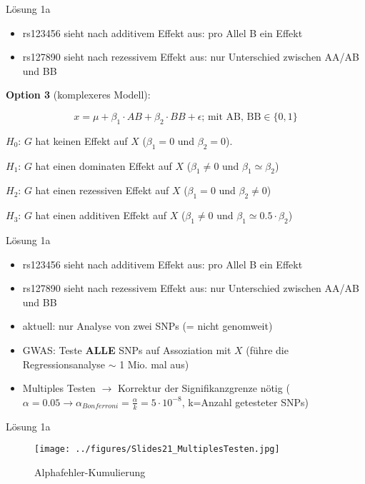 \documentclass{beamer}
\begin{document}
\begin{frame}{Lösung 1a}
\begin{itemize}
    \item rs123456 sieht nach additivem Effekt aus: pro Allel B ein Effekt
    \item rs127890 sieht nach rezessivem Effekt aus: nur Unterschied zwischen AA/AB und BB
\end{itemize}

\textbf{Option 3} (komplexeres Modell):

$$ x = \mu + \beta_1 \cdot AB + \beta_2 \cdot BB + \epsilon \text{;  mit AB, BB} \in \{0,1\}$$

$H_0$: $G$ hat keinen Effekt auf $X$ ($\beta_1 = 0$ und $\beta_2 = 0$). 

$H_1$: $G$ hat einen dominaten Effekt auf $X$ ($\beta_1 \neq 0$ und $\beta_1 \simeq \beta_2$)

$H_2$: $G$ hat einen rezessiven Effekt auf $X$ ($\beta_1 = 0$ und $\beta_2 \neq 0$)

$H_3$: $G$ hat einen additiven Effekt auf $X$ ($\beta_1 \neq 0$ und $\beta_1 \simeq 0.5 \cdot \beta_2$)

\end{frame}

\begin{frame}{Lösung 1a}
\begin{itemize}
    \item rs123456 sieht nach additivem Effekt aus: pro Allel B ein Effekt
    \item rs127890 sieht nach rezessivem Effekt aus: nur Unterschied zwischen AA/AB und BB
    \item aktuell: nur Analyse von zwei SNPs (= nicht genomweit)
    \item GWAS: Teste \textbf{ALLE} SNPs auf Assoziation mit $X$ (führe die Regressionsanalyse $\sim$ 1 Mio. mal aus)
    \item Multiples Testen $\rightarrow$ Korrektur der Signifikanzgrenze nötig ($\alpha=0.05 \rightarrow \alpha_{Bonferroni} = \frac{\alpha}{k} = 5\cdot 10^{-8}$, k=Anzahl getesteter SNPs)
\end{itemize}
\end{frame}

\begin{frame}{Lösung 1a}
\begin{figure}[h]
\begin{center}
\texttt{[image: ../figures/Slides21\_MultiplesTesten.jpg]}
\caption{Alphafehler-Kumulierung}
\label{fig:MultiplesTesten}
\end{center}
\end{figure}
\end{frame}
\end{document}
